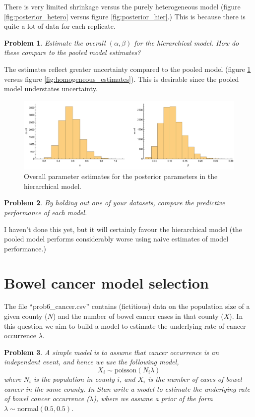 \documentclass{article}
\newtheorem{problem}{Problem}[section]
\begin{document}
There is very limited shrinkage versus the purely heterogeneous model (figure \ref{fig:posterior_hetero} versus figure \ref{fig:posterior_hier}.) This is because there is quite a lot of data for each replicate.

\begin{problem}
	Estimate the overall $(\alpha,\beta)$ for the hierarchical model. How do these compare to the pooled model estimates?
\end{problem}

The estimates reflect greater uncertainty compared to the pooled model (figure \ref{fig:posterior_hierOverall} versus figure \ref{fig:homogeneous_estimates}). This is desirable since the pooled model understates uncertainty.

\begin{figure}[ht]
	\centerline{\includegraphics[width=1\textwidth]{figures/prob6_overallAlphaBeta.pdf}}
		\caption{Overall parameter estimates for the posterior parameters in the hierarchical model.}\label{fig:posterior_hierOverall}
	\end{figure}


\begin{problem}
	By holding out one of your datasets, compare the predictive performance of each model.
\end{problem}

I haven't done this yet, but it will certainly favour the hierarchical model (the pooled model performs considerably worse using naive estimates of model performance.)

\section{Bowel cancer model selection}
The file ``prob6\_cancer.csv'' contains (fictitious) data on the population size of a given county ($N$) and the number of bowel cancer cases in that county ($X$). In this question we aim to build a model to estimate the underlying rate of cancer occurrence $\lambda$.

\begin{problem}
	A simple model is to assume that cancer occurrence is an independent event, and hence we use the following model,
	\begin{equation}
	 X_i \sim \text{poisson}(N_i\lambda)
	\end{equation}
	where $N_i$ is the population in county $i$, and $X_i$ is the number of cases of bowel cancer in the same county. In Stan write a model to estimate the underlying rate of bowel cancer occurrence ($\lambda$), where we assume a prior of the form $\lambda\sim \text{normal}(0.5,0.5)$.
\end{problem}
\end{document}
